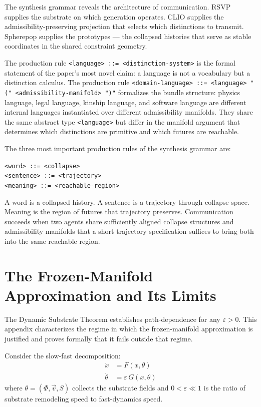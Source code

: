 \documentclass[12pt,a4paper]{article}
\begin{document}
\noindent The synthesis grammar reveals the architecture of communication. RSVP supplies the substrate on which generation operates. CLIO supplies the admissibility-preserving projection that selects which distinctions to transmit. Spherepop supplies the prototypes --- the collapsed histories that serve as stable coordinates in the shared constraint geometry.

The production rule \texttt{<language> ::= <distinction-system>} is the formal statement of the paper's most novel claim: a language is not a vocabulary but a distinction calculus. The production rule \texttt{<domain-language> ::= <language> "(" <admissibility-manifold> ")"} formalizes the bundle structure: physics language, legal language, kinship language, and software language are different internal languages instantiated over different admissibility manifolds. They share the same abstract type \texttt{<language>} but differ in the manifold argument that determines which distinctions are primitive and which futures are reachable.

The three most important production rules of the synthesis grammar are:

\medskip
\texttt{<word> ::= <collapse>}\\
\texttt{<sentence> ::= <trajectory>}\\
\texttt{<meaning> ::= <reachable-region>}
\medskip

\noindent A word is a collapsed history. A sentence is a trajectory through collapse space. Meaning is the region of futures that trajectory preserves. Communication succeeds when two agents share sufficiently aligned collapse structures and admissibility manifolds that a short trajectory specification suffices to bring both into the same reachable region.

\section{The Frozen-Manifold Approximation and Its Limits}
\label{app:frozen}

The Dynamic Substrate Theorem establishes path-dependence for any $\varepsilon > 0$. This appendix characterizes the regime in which the frozen-manifold approximation is justified and proves formally that it fails outside that regime.

Consider the slow-fast decomposition:
\begin{align}
\dot{x} &= F(x, \theta) \label{eq:sf-fast}\\
\dot{\theta} &= \varepsilon\, G(x, \theta) \label{eq:sf-slow}
\end{align}
where $\theta = (\Phi, \vec{v}, S)$ collects the substrate fields and $0 < \varepsilon \ll 1$ is the ratio of substrate remodeling speed to fast-dynamics speed.
\end{document}
